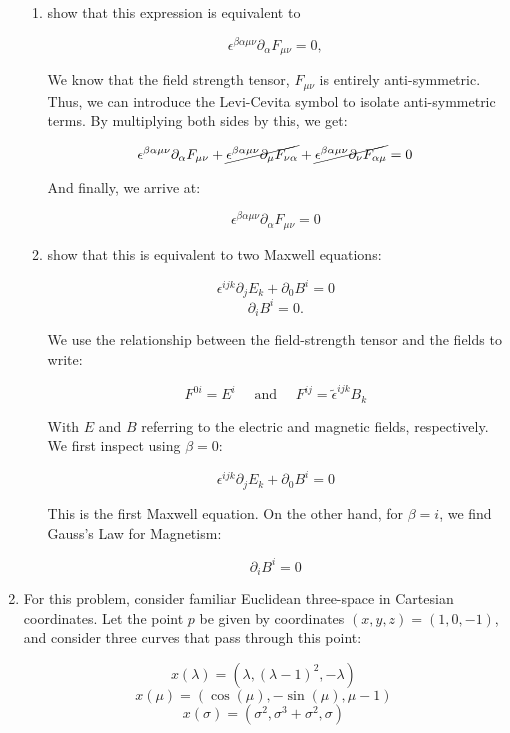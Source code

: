 \begin{enumerate}
\begin{enumerate}
      \item show that this expression is equivalent to 

      $$\epsilon^{\beta\alpha\mu\nu}\partial_{\alpha}F_{\mu\nu}=0,$$ 

      We know that the field strength tensor, $F_{\mu\nu}$ is entirely anti-symmetric. Thus, we can introduce the Levi-Cevita symbol to isolate anti-symmetric terms. By multiplying both sides by this, we get:

      $$\epsilon^{\beta\alpha\mu\nu}\partial_{\alpha}F_{\mu\nu}+\cancel{\epsilon^{\beta\alpha\mu\nu}\partial_{\mu}F_{\nu\alpha}}+\cancel{\epsilon^{\beta\alpha\mu\nu}\partial_{\nu}F_{\alpha\mu}}=0$$

      And finally, we arrive at:

      $$\boxed{\epsilon^{\beta\alpha\mu\nu}\partial_{\alpha}F_{\mu\nu}=0}$$ 

      \item show that this is equivalent to two Maxwell equations: 

        $$\epsilon^{ijk}\partial_jE_k + \partial_0B^i = 0$$
        $$\partial_iB^i = 0.$$

        We use the relationship between the field-strength tensor and the fields to write:

        $$F^{0i}=E^i\quad\text{ and }\quad F^{ij}=\tilde{\epsilon}^{ijk}B_k$$

        With $E$ and $B$ referring to the electric and magnetic fields, respectively. We first inspect using $\beta=0$:

        $$\boxed{\epsilon^{ijk}\partial_jE_k+\partial_0B^i=0}$$

        This is the first Maxwell equation. On the other hand, for $\beta=i$, we find Gauss's Law for Magnetism:

        $$\boxed{\partial_iB^i=0}$$

    \end{enumerate}

  \item For this problem, consider familiar Euclidean three-space in Cartesian coordinates. Let the point $p$ be given by coordinates $(x, y, z) = (1, 0, -1)$, and consider three curves that pass through this point:

    $$x(\lambda)=(\lambda, (\lambda-1)^2,-\lambda)$$
    $$x(\mu)=(\cos(\mu),-\sin(\mu),\mu-1)$$
    $$x(\sigma)=(\sigma^2, \sigma^3+\sigma^2,\sigma)$$

    \begin{enumerate}


\end{enumerate}
\end{enumerate}
